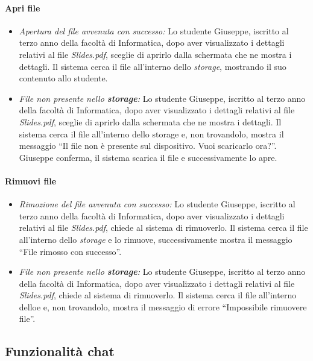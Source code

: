 \paragraph{Apri file}
\begin{itemize}
	\item \textit{Apertura del file avvenuta con successo:}
	Lo studente Giuseppe, iscritto al terzo anno della facoltà di Informatica, dopo aver visualizzato i dettagli relativi al file \textit{Slides.pdf}, sceglie di aprirlo dalla schermata che ne mostra i dettagli. Il sistema cerca il file all'interno dello \textit{storage}, mostrando il suo contenuto allo studente.
	
	\item \textit{File non presente nello \textbf{storage}:}
	Lo studente Giuseppe, iscritto al terzo anno della facoltà di Informatica, dopo aver visualizzato i dettagli relativi al file \textit{Slides.pdf}, sceglie di aprirlo dalla schermata che ne mostra i dettagli. Il sistema cerca il file all'interno dello storage e, non trovandolo, mostra il messaggio “Il file non è presente sul dispositivo. Vuoi scaricarlo ora?”. Giuseppe conferma, il sistema scarica il file e successivamente lo apre.
\end{itemize}

\paragraph{Rimuovi file}
\begin{itemize}
	\item \textit{Rimozione del file avvenuta con successo:}
	Lo studente Giuseppe, iscritto al terzo anno della facoltà di Informatica, dopo aver visualizzato i dettagli relativi al file \textit{Slides.pdf}, chiede al sistema di rimuoverlo. Il sistema cerca il file all'interno dello \textit{storage} e lo rimuove, successivamente mostra il messaggio “File rimosso con successo”.
	
	\item \textit{File non presente nello \textbf{storage}:}
	Lo studente Giuseppe, iscritto al terzo anno della facoltà di Informatica, dopo aver visualizzato i dettagli relativi al file \textit{Slides.pdf}, chiede al sistema di rimuoverlo. Il sistema cerca il file all'interno delloe e, non trovandolo, mostra il messaggio di errore “Impossibile rimuovere file”.
\end{itemize}

\subsection{Funzionalità chat}

